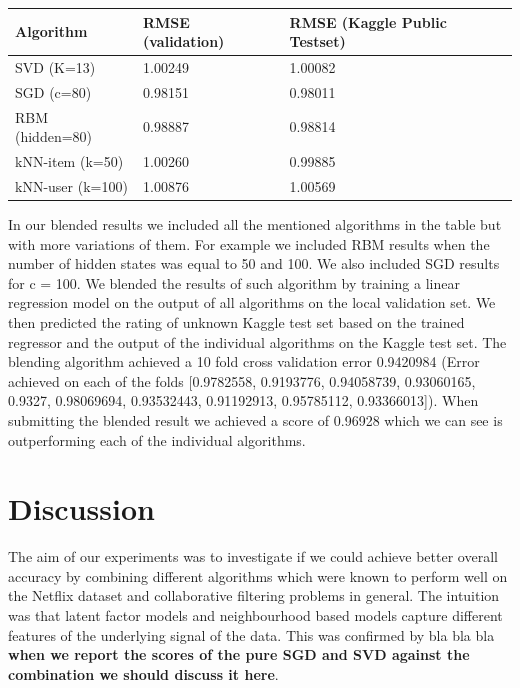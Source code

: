 \documentclass[10pt,conference,compsocconf]{IEEEtran}
\begin{document}
	\begin{center}
		\begin{tabular}{ |p{2.8cm}||p{2.4cm}|p{2.3cm}|  }
			\hline
			Algorithm & RMSE (validation) & RMSE (Kaggle Public Testset) \\ [0.5ex] 
			\hline\hline
			SVD (K=13) & 1.00249 & 1.00082 \\ 
			\hline
			SGD (c=80) & 0.98151
			 &  0.98011 \\
			\hline
			RBM (hidden=80) & 0.98887 & 0.98814 \\
			\hline
			kNN-item (k=50) & 1.00260 & 0.99885 \\ 
			\hline
			kNN-user (k=100) & 1.00876 & 1.00569 \\ [1ex] 
			\hline
		\end{tabular}
	\end{center}
	
	In our blended results we included all the mentioned algorithms in the table but with more variations of them. For example we included RBM results when the number of hidden states was equal to 50 and 100. We also included SGD results for c = 100. We blended the results of such algorithm by training a linear regression model on the output of all algorithms on the local validation set. We then predicted the rating of unknown Kaggle test set based on the trained regressor and the output of the individual algorithms on the Kaggle test set. The blending algorithm achieved a 10 fold cross validation error 0.9420984 (Error achieved on each of the folds [0.9782558, 0.9193776, 0.94058739, 0.93060165, 0.9327, 0.98069694, 0.93532443, 0.91192913, 0.95785112, 0.93366013]). When submitting the blended result we achieved a score of 0.96928 which we can see is outperforming each of the individual algorithms.
	
	\section{Discussion}
	\label{sec:discussion}
	The aim of our experiments was to investigate if we could achieve better overall accuracy by combining different algorithms which were known to perform well on the Netflix dataset and collaborative filtering problems in general. The intuition was that latent factor models and neighbourhood based models capture different features of the underlying signal of the data. This was confirmed by bla bla bla \textbf{when we report the scores  of the pure SGD and SVD against the combination we should discuss it here}. 
	
\end{document}
